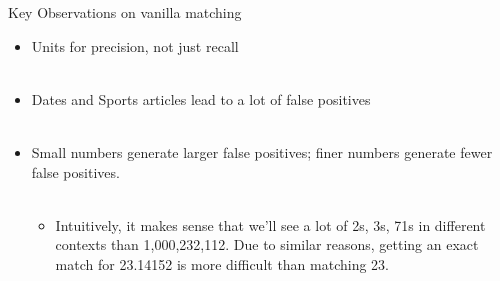\documentclass{beamer}
\begin{document}
 \begin{frame}{Key Observations on vanilla matching}
  
  \begin{itemize}
   
   \item Units for precision, not just recall \\~\\
   
   \item Dates and Sports articles lead to a lot of false positives \\~\\
   
   \item Small numbers generate larger false positives; finer numbers generate fewer false positives. \\~\\
    \begin{itemize}
      \item Intuitively, it makes sense that we'll see a lot of 2s, 3s, 71s in different contexts than 1,000,232,112. Due to similar reasons, getting an exact match for 23.14152 is more difficult than matching 23. \\~\\
    \end{itemize}
  \end{itemize}
 \end{frame}
\end{document}
